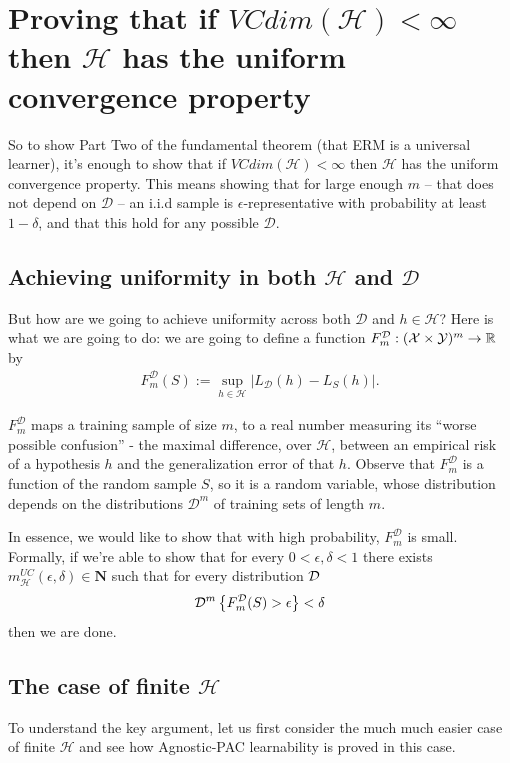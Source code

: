 \documentclass[11pt]{article}
\newcommand{\R}{\ensuremath{\mathbb{R}}}
\newcommand{\Dc}{\mathcal{D}}
\newcommand{\Hc}{\mathcal{H}}
\begin{document}
\section{Proving that if $VCdim(\Hc)<\infty$ then $\Hc$ has the uniform
convergence property}

So to show Part Two of the fundamental theorem (that ERM is a universal
learner), it's enough to show that  if $VCdim(\Hc)<\infty$ then $\Hc$ has the uniform
convergence property.
This means showing that for large enough $m$ -- that does not
depend on $\Dc$ -- an i.i.d sample is
$\epsilon$-representative with probability at least $1-\delta$, and that this
hold for  any possible $\Dc$. 





\subsection{Achieving uniformity in both $\Hc$ and $\Dc$}

But how are we going to achieve uniformity across both $\Dc$ and $h\in\Hc$?
Here is what we are going to do: we are going to define 
a function $F^\Dc_m:(\X\times\Y)^m\to\R$ by
\begin{eqnarray} \label{F:eq}
    F^\Dc_m(S) := \sup_{h\in\Hc} \Big| L_\Dc(h) - L_S(h) \Big|.
\end{eqnarray}

$F^\Dc_m$ maps a training sample of size $m$, to a real number measuring its
``worse possible confusion'' - the maximal difference, over $\Hc$, between an
empirical risk of a hypothesis $h$ and the generalization error of that $h$. 
Observe that $F^\Dc_m$ is a function of the random sample $S$, so it is 
a random variable,
whose distribution depends on the distributions $\Dc^m$ of training sets of
length $m$. 
 
In essence, we would like to show that with high probability, $F^\Dc_m$ is small.
Formally, if we're able to show that for every $0<\epsilon,\delta<1$ there
exists $m^{UC}_\Hc(\epsilon,\delta)\in\mathbf{N}$ such that for every distribution $\mathcal{D}$
\[
  \D^m\left\{ F_m^\Dc(S)>\epsilon \right\} < \delta
\]
then we are done.

\subsection{The case of finite $\Hc$}


To understand the key argument, let us first consider the much much easier case
of finite $\Hc$ and see how Agnostic-PAC learnability is proved in this case. 
\end{document}
